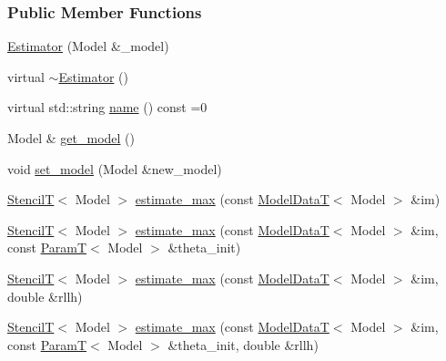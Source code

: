 \subsubsection*{Public Member Functions}
\begin{DoxyCompactItemize}
\item 
\hyperlink{classmappel_1_1Estimator_a03177042591f1ffbaf377765b5486824}{Estimator} (Model \&\+\_\+model)
\item 
virtual \hyperlink{classmappel_1_1Estimator_a629823fa91d4b461b2b1f607d588e558}{$\sim$\+Estimator} ()
\item 
virtual std\+::string \hyperlink{classmappel_1_1Estimator_a403f11575f81e47095e57cc403fd760d}{name} () const =0
\item 
Model \& \hyperlink{classmappel_1_1Estimator_a6c0b757d89033d70bdf03ad1fe6b03da}{get\+\_\+model} ()
\item 
void \hyperlink{classmappel_1_1Estimator_aacade4f66038545ad196edf7e8596187}{set\+\_\+model} (Model \&new\+\_\+model)
\item 
\hyperlink{namespacemappel_a3a06598240007876f8c4bf834ad86197}{StencilT}$<$ Model $>$ \hyperlink{classmappel_1_1Estimator_a4406c994d5b6239e75628ea5d479bfa2}{estimate\+\_\+max} (const \hyperlink{namespacemappel_a97f050df953605381ae9c901c3b125f1}{Model\+DataT}$<$ Model $>$ \&im)
\item 
\hyperlink{namespacemappel_a3a06598240007876f8c4bf834ad86197}{StencilT}$<$ Model $>$ \hyperlink{classmappel_1_1Estimator_aa8aa62047bfc28b1df3a9261da4f38a1}{estimate\+\_\+max} (const \hyperlink{namespacemappel_a97f050df953605381ae9c901c3b125f1}{Model\+DataT}$<$ Model $>$ \&im, const \hyperlink{namespacemappel_a667925cb0d6c0e49f2f035cc5a9a6857}{ParamT}$<$ Model $>$ \&theta\+\_\+init)
\item 
\hyperlink{namespacemappel_a3a06598240007876f8c4bf834ad86197}{StencilT}$<$ Model $>$ \hyperlink{classmappel_1_1Estimator_ab1be1fb34a71f9a46700c9d455fd5daf}{estimate\+\_\+max} (const \hyperlink{namespacemappel_a97f050df953605381ae9c901c3b125f1}{Model\+DataT}$<$ Model $>$ \&im, double \&rllh)
\item 
\hyperlink{namespacemappel_a3a06598240007876f8c4bf834ad86197}{StencilT}$<$ Model $>$ \hyperlink{classmappel_1_1Estimator_a2544f56248cb0f0763c964ddfaad32cc}{estimate\+\_\+max} (const \hyperlink{namespacemappel_a97f050df953605381ae9c901c3b125f1}{Model\+DataT}$<$ Model $>$ \&im, const \hyperlink{namespacemappel_a667925cb0d6c0e49f2f035cc5a9a6857}{ParamT}$<$ Model $>$ \&theta\+\_\+init, double \&rllh)
\item 

\end{DoxyCompactItemize}
